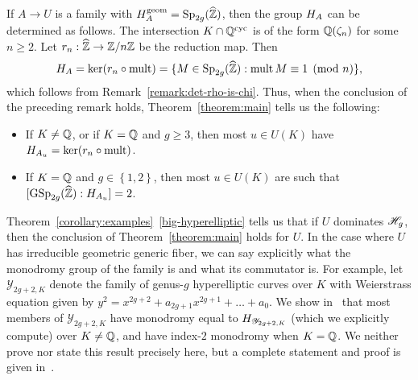 \begin{remark}
       If $A \to U$ is a family with $H_A^{\operatorname{geom}} = \operatorname{Sp}_{2g}(\widehat{{\mathbb Z}})$, then the group $H_A$ can be determined as follows. The intersection $K \cap {\mathbb Q}^{\operatorname{cyc}}$ is of the form ${\mathbb Q}(\zeta_n)$ for some $n \ge 2$. Let $r_n : \widehat{{\mathbb Z}} \to {\mathbb Z} / n {\mathbb Z}$ be the reduction map. Then
    \[
       H_A = \ker (r_n \circ \operatorname{mult}) = \{M \in \operatorname{Sp}_{2g}(\widehat{{\mathbb Z}}) : \operatorname{mult} M \equiv 1 \pmod{n} \},
    \]
       which follows from Remark~\ref{remark:det-rho-is-chi}.
Thus, when the conclusion of the preceding remark holds, Theorem~\ref{theorem:main} tells us the following:
    \begin{itemize}
           \item If $K\neq {\mathbb Q}$, or if $K = {\mathbb Q}$ and $g \ge 3$, then most $u \in U(K)$ have $H_{A_u} = \ker (r_n \circ \operatorname{mult})$.
	   \item If $K = {\mathbb Q}$ and $g \in \left\{ 1,2 \right\}$, then most $u \in U(K)$ are such that $[\operatorname{GSp}_{2g}(\widehat{{\mathbb Z}}) : H_{A_u}] = 2$.
       \end{itemize}
\end{remark}

\begin{remark} \label{remark:}
	Theorem~\ref{corollary:examples}~\ref{big-hyperelliptic} tells us that if $U$ dominates $\mathscr H_{g}$, then the conclusion of Theorem~\ref{theorem:main} holds for $U$. In the case where $U$ has irreducible geometric generic fiber, we can say explicitly what the monodromy group of the family is and what its commutator is. For example, let $\mathscr{Y}_{2g+2,K}$ denote the family of genus-$g$ hyperelliptic curves over $K$ with Weierstrass equation given by $y^2 = x^{2g+2} + a_{2g+1}x^{2g+1} + \dots + a_0$. We show in~\cite[Theorem 1.2]{landesman-swaminathan-tao-xu:hyperelliptic-curves} that most members of $\mathscr{Y}_{2g+2, K}$ have monodromy equal to $H_{\mathscr Y_{2g+2,K}}$ (which we explicitly compute) over $K \neq \mathbb Q$, and have index-$2$ monodromy when $K = \mathbb Q$. We neither prove nor state this result precisely here, but a complete statement and proof is given in~\cite{landesman-swaminathan-tao-xu:hyperelliptic-curves}.
\end{remark}
